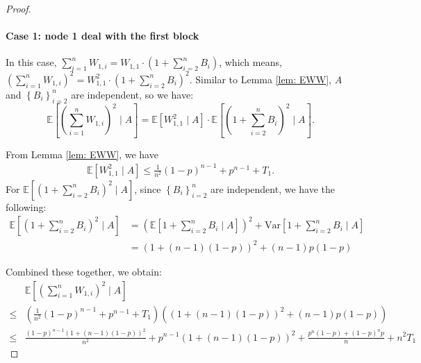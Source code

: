 \begin{lemma}
\begin{proof}
\paragraph{Case 1: node 1 deal with the first block} 
 In this case, $\sum\limits_{i=1}^n W_{1,i} = W_{1,1}\cdot \left(1+\sum\limits_{i=2}^n B_i \right)$, which means, $\left(\sum\limits_{i=1}^n W_{1,i}\right)^2 = W_{1,1}^2\cdot \left(1+\sum\limits_{i=2}^n B_i\right)^2$. Similar to Lemma \ref{lem: EWW}, $A$ and $\left\{B_i\right\}_{i=2}^n$ are independent, so we have:
 \begin{equation*}
 	\mathbb{E} \left[\left(\sum\limits_{i=1}^n W_{1,i}\right)^2\mid A\right] = \mathbb{E} \left[W_{1,1}^2\mid A\right]\cdot \mathbb{E} \left[ \left(1+\sum\limits_{i=2}^n B_i\right)^2\mid A\right].
\end{equation*}

From Lemma \ref{lem: EWW}, we have 
\begin{align*}
\mathbb{E} \left[W_{1,1}^2\mid A\right] \le \frac{1}{n^2}(1-p)^{n-1} + p^{n-1} +T_1.
\end{align*}
For $\mathbb{E} [(1+\sum\limits_{i=2}^n B_i)^2\mid A]$, since $\left\{B_i\right\}_{i=2}^n$ are independent, we have the following:
\begin{align*}
	\mathbb{E} \left[ \left(1+\sum\limits_{i=2}^n B_i\right)^2\mid A\right]&=\left(\mathbb{E} \left[1+\sum\limits_{i=2}^n B_i\mid A\right]\right)^2 + \mathrm{Var}\left[1+\sum\limits_{i=2}^n B_i\mid A\right]\\
	& = \left(1+\left(n-1\right)\left(1-p\right)\right)^2 + (n-1)p(1-p)
\end{align*}

Combined these together, we obtain:
\begin{align*}
	&\mathbb{E} \left[\left(\sum\limits_{i=1}^n W_{1,i}\right)^2\mid A\right]\\
	\leq & \left(\frac{1}{n^2}(1-p)^{n-1} + p^{n-1} +T_1\right)\left(\left(1+\left(n-1\right)\left(1-p\right)\right)^2 + (n-1)p(1-p)\right)\\
	\leq & \frac{(1-p)^{n-1}(1+(n-1)(1-p))^2}{n^2} + p^{n-1}(1+(n-1)(1-p))^2 + \frac{p^n(1-p) + (1-p)^np}{n} + n^2 T_1
\end{align*}


\end{proof}
\end{lemma}
